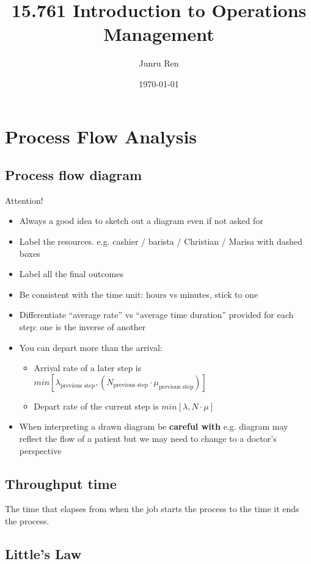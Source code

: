 \documentclass[11pt]{article}
\title{ 15.761 Introduction to Operations Management }
\author{ Junru Ren }
\date{\today}
\begin{document}
\maketitle	

\section{Process Flow Analysis}

\subsection{Process flow diagram}

Attention!
\begin{itemize}
    \item Always a good idea to sketch out a diagram even if not asked for
    \item Label the resources. e.g. cashier / barista / Christian / Marisa with dashed boxes
    \item Label all the final outcomes
    \item Be consistent with the time unit: hours vs minutes, stick to one
    \item Differentiate ``average rate'' vs ``average time duration'' provided for each step: one is the inverse of another
    \item You can depart more than the arrival: \begin{itemize}
        \item Arrival rate of a later step is $min\left[\lambda_{\text{previous step}}, \left(N_{\text{previous step}} \cdot \mu_{\text{previous step}}\right)\right]$
        \item Depart rate of the current step is $min\left[\lambda, N \cdot \mu\right]$
    \end{itemize}
    \item When interpreting a drawn diagram be \textbf{careful with } e.g. diagram may reflect the flow of a patient but we may need to change to a doctor's perspective
\end{itemize}

\subsection{Throughput time}

The time that elapses from when the job starts the process to the time it ends the process.

\subsection{Little's Law}
\end{document}
